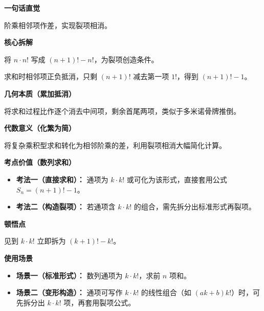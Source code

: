 \begin{explanationbox}

	\textbf{\textcolor{CExplanation}{一句话直觉}}

	阶乘相邻项作差，实现裂项相消。

	\medskip
	\textbf{\textcolor{CExplanation}{核心拆解}}
	\begin{description}[style=nextline, leftmargin=2.8em, labelsep=0.5em, itemsep=0.45em]
		\item[\textbf{要点一（裂项公式）：}] 将 $n\cdot n!$ 写成 $(n+1)!-n!$，为裂项创造条件。
		\item[\textbf{要点二（累加消项）：}] 求和时相邻项正负抵消，只剩 $(n+1)!$ 减去第一项 $1!$，得到 $(n+1)!-1$。
	\end{description}

	\medskip
	\textbf{\textcolor{CExplanation}{几何本质（累加抵消）}}

	将求和过程比作逐个消去中间项，剩余首尾两项，类似于多米诺骨牌推倒。

	\medskip
	\textbf{\textcolor{CExplanation}{代数意义（化繁为简）}}

	将复杂乘积型求和转化为相邻阶乘的差，利用裂项相消大幅简化计算。

	\medskip
	\textbf{\textcolor{CExplanation}{考点价值（数列求和）}}
	\begin{itemize}[leftmargin=*, itemsep=0.5em, topsep=0.4em]
		\item \textbf{考法一（直接求和）：} 通项为 $k\cdot k!$ 或可化为该形式，直接套用公式 $S_n=(n+1)!-1$。
		\item \textbf{考法二（构造裂项）：} 若通项含 $k\cdot k!$ 的组合，需先拆分出标准形式再裂项。
	\end{itemize}

	\medskip
	\textbf{\textcolor{CExplanation}{顿悟点}}

	见到 $k\cdot k!$ 立即拆为 $(k+1)!-k!$。

	\medskip
	\textbf{\textcolor{CExplanation}{使用场景}}
	\begin{itemize}[leftmargin=*, itemsep=0.5em, topsep=0.4em]
		\item \textbf{场景一（标准形式）：} 数列通项为 $k\cdot k!$，求前 $n$ 项和。
		\item \textbf{场景二（变形构造）：} 通项可写作 $k\cdot k!$ 的线性组合（如 $(ak+b)k!$）时，可先拆分出 $k\cdot k!$ 项，再套用裂项公式。
	\end{itemize}

\end{explanationbox}

